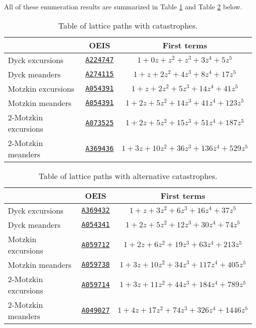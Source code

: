 All of these enumeration results are summarized in Table \ref{tab:OEIS_cat} and Table \ref{tab:OEIS_alt} below.

\bgroup
\def\arraystretch{1.25}
\begin{table}[hbt!]
  \centering
  \begin{tabular}{|l|c|c|}
  \hline
  & \textbf{OEIS} & \textbf{First terms} \\ \hline
  Dyck excursions & \href{https://oeis.org/A224747}{\texttt{A224747}} & $1+0z+z^2+z^3+3z^4+5z^5$ \\ \hline
  Dyck meanders & \href{https://oeis.org/A274115}{\texttt{A274115}} & $1+z+2z^2+4z^3+8z^4+17z^5$  \\ \hline
  Motzkin excursions & \href{https://oeis.org/A054391}{\texttt{A054391}} & $1+z+2z^2+5z^3+14z^4+41z^5$ \\ \hline
  Motzkin meanders & \href{https://oeis.org/A054391}{\texttt{A054391}} & $1+2z+5z^2+14z^3+41z^4+123z^5$ \\ \hline
  2-Motzkin excursions & \href{https://oeis.org/A073525}{\texttt{A073525}} & $1+2z+5z^2+15z^3+51z^4+187z^5$ \\ \hline
  2-Motzkin meanders & \href{https://oeis.org/A369436}{\texttt{A369436}} & $1 + 3z + 10z^2 + 36z^3 + 136z^4 + 529z^5$ \\ \hline
  \end{tabular}
  \caption{Table of lattice paths with catastrophes.}
  \label{tab:OEIS_cat}
\end{table}

\begin{table}[hbt!]
  \centering
  \begin{tabular}{|l|c|c|}
  \hline
  & \textbf{OEIS} & \textbf{First terms} \\ \hline
  Dyck excursions & \href{https://oeis.org/A369432}{\texttt{A369432}} & $1+z+3z^2+6z^3+16z^4+37z^5$ \\ \hline
  Dyck meanders & \href{https://oeis.org/A054341}{\texttt{A054341}} & $1+2z+5z^2+12z^3+30z^4+74z^5$  \\ \hline
  Motzkin excursions & \href{https://oeis.org/A059712}{\texttt{A059712}} & $1+2z+6z^2+19z^3+63z^4+213z^5$  \\ \hline
  Motzkin meanders & \href{https://oeis.org/A059738}{\texttt{A059738}} & $1+3z+10z^2+34z^3+117z^4+405z^5$  \\ \hline
  2-Motzkin excursions & \href{https://oeis.org/A059714}{\texttt{A059714}} & $1 + 3z + 11z^{2} + 44z^{3} + 184z^{4} + 789z^{5}$ \\ \hline
  2-Motzkin meanders & \href{https://oeis.org/A049027}{\texttt{A049027}} & $1 + 4z + 17z^{2}+ 74z^{3} + 326z^{4} + 1446z^{5}$ \\ \hline
  \end{tabular}
  \caption{Table of lattice paths with alternative catastrophes.}
  \label{tab:OEIS_alt}
\end{table}
\egroup

